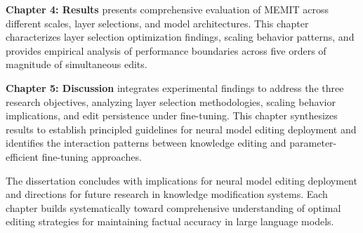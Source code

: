 \textbf{Chapter 4: Results} presents comprehensive evaluation of MEMIT across different scales, layer selections, and model architectures. This chapter characterizes layer selection optimization findings, scaling behavior patterns, and provides empirical analysis of performance boundaries across five orders of magnitude of simultaneous edits.

\textbf{Chapter 5: Discussion} integrates experimental findings to address the three research objectives, analyzing layer selection methodologies, scaling behavior implications, and edit persistence under fine-tuning. This chapter synthesizes results to establish principled guidelines for neural model editing deployment and identifies the interaction patterns between knowledge editing and parameter-efficient fine-tuning approaches.

The dissertation concludes with implications for neural model editing deployment and directions for future research in knowledge modification systems. Each chapter builds systematically toward comprehensive understanding of optimal editing strategies for maintaining factual accuracy in large language models.
